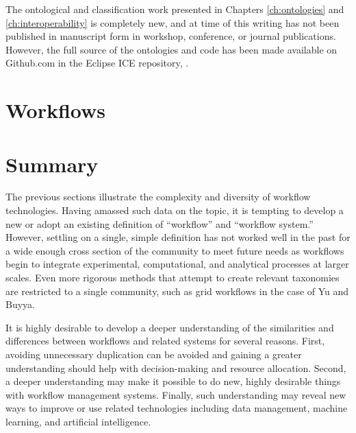 The ontological and classification work presented in Chapters
\ref{ch:ontologies} and \ref{ch:interoperability} is completely new, and at
time of this writing has not been published in manuscript form in
workshop, conference, or journal publications. However, the full source of the
ontologies and code has been made available on Github.com in the Eclipse ICE repository,
\cite{billings_ice}.


\section{Workflows}



\section{Summary}

The previous sections illustrate the complexity and diversity of workflow
technologies. Having amassed such data on the topic, it is tempting to develop
a new or adopt an existing definition of ``workflow'' and ``workflow system.''
However, settling on a single, simple definition has not worked well in the past
for a wide enough cross section of the community to meet future needs as workflows
begin to integrate experimental, computational, and analytical processes at
larger scales. Even more rigorous methods that attempt to create relevant
taxonomies are restricted to a single community, such as grid workflows in the
case of Yu and Buyya.

It is highly desirable to develop a deeper understanding of the similarities and
differences between workflows and related systems for several reasons. First,
avoiding unnecessary duplication can be avoided and gaining a greater
understanding should help with decision-making and resource allocation. Second,
a deeper understanding may make it possible to do new, highly desirable things
with workflow management systems. Finally, such understanding may reveal new
ways to improve or use related technologies including data management, machine learning, and
artificial intelligence.

